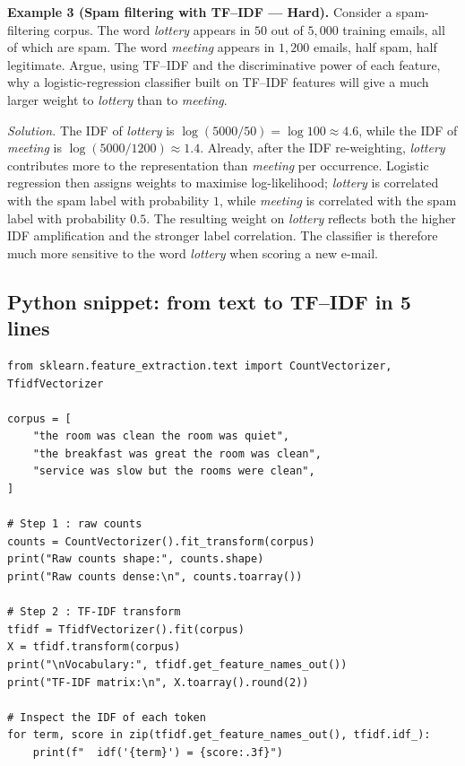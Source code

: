 \medskip

\textbf{Example 3 (Spam filtering with TF--IDF --- Hard).}
Consider a spam-filtering corpus. The word \emph{lottery} appears in $50$ out of $5{,}000$ training emails, all of which are spam. The word \emph{meeting} appears in $1{,}200$ emails, half spam, half legitimate. Argue, using TF--IDF and the discriminative power of each feature, why a logistic-regression classifier built on TF--IDF features will give a much larger weight to \emph{lottery} than to \emph{meeting}.

\textit{Solution.} The IDF of \emph{lottery} is $\log(5000/50) = \log 100 \approx 4.6$, while the IDF of \emph{meeting} is $\log(5000/1200) \approx 1.4$. Already, after the IDF re-weighting, \emph{lottery} contributes more to the representation than \emph{meeting} per occurrence. Logistic regression then assigns weights to maximise log-likelihood; \emph{lottery} is correlated with the spam label with probability $1$, while \emph{meeting} is correlated with the spam label with probability $0.5$. The resulting weight on \emph{lottery} reflects both the higher IDF amplification and the stronger label correlation. The classifier is therefore much more sensitive to the word \emph{lottery} when scoring a new e-mail.

\subsection{Python snippet: from text to TF--IDF in 5 lines}

\begin{lstlisting}
from sklearn.feature_extraction.text import CountVectorizer, TfidfVectorizer

corpus = [
    "the room was clean the room was quiet",
    "the breakfast was great the room was clean",
    "service was slow but the rooms were clean",
]

# Step 1 : raw counts
counts = CountVectorizer().fit_transform(corpus)
print("Raw counts shape:", counts.shape)
print("Raw counts dense:\n", counts.toarray())

# Step 2 : TF-IDF transform
tfidf = TfidfVectorizer().fit(corpus)
X = tfidf.transform(corpus)
print("\nVocabulary:", tfidf.get_feature_names_out())
print("TF-IDF matrix:\n", X.toarray().round(2))

# Inspect the IDF of each token
for term, score in zip(tfidf.get_feature_names_out(), tfidf.idf_):
    print(f"  idf('{term}') = {score:.3f}")
\end{lstlisting}

